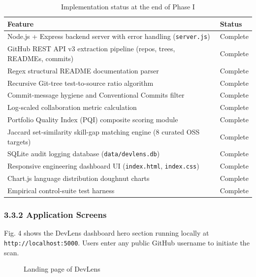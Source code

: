 \documentclass[12pt,a4paper]{article}
\begin{document}
\begin{table}[h!]
\centering
\caption{Implementation status at the end of Phase I}
\label{tab:status}
\small
\begin{tabularx}{\textwidth}{|X|p{4.2cm}|}
\hline
\textbf{Feature} & \textbf{Status} \\ \hline
Node.js + Express backend server with error handling (\texttt{server.js}) & Complete \\ \hline
GitHub REST API v3 extraction pipeline (repos, trees, READMEs, commits) & Complete \\ \hline
Regex structural README documentation parser & Complete \\ \hline
Recursive Git-tree test-to-source ratio algorithm & Complete \\ \hline
Commit-message hygiene and Conventional Commits filter & Complete \\ \hline
Log-scaled collaboration metric calculation & Complete \\ \hline
Portfolio Quality Index (PQI) composite scoring module & Complete \\ \hline
Jaccard set-similarity skill-gap matching engine (8 curated OSS targets) & Complete \\ \hline
SQLite audit logging database (\texttt{data/devlens.db}) & Complete \\ \hline
Responsive engineering dashboard UI (\texttt{index.html}, \texttt{index.css}) & Complete \\ \hline
Chart.js language distribution doughnut charts & Complete \\ \hline
Empirical control-suite test harness & Complete \\ \hline
\end{tabularx}
\end{table}

\subsubsection{3.3.2 Application Screens}
Fig. 4 shows the DevLens dashboard hero section running locally at \texttt{http://localhost:5000}. Users enter any public GitHub username to initiate the scan.

\begin{figure}[h!]
\centering
\vspace{0.3cm}
\vspace{0.3cm}
\caption{Landing page of DevLens}
\end{figure}
\end{document}
